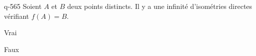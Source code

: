 \begin{truefalse}{q-565}
Soient $A$ et $B$ deux points distincts. Il y a une infinité d'isométries directes vérifiant $f(A)=B$.
\item* Vrai
\item Faux
\end{truefalse}

